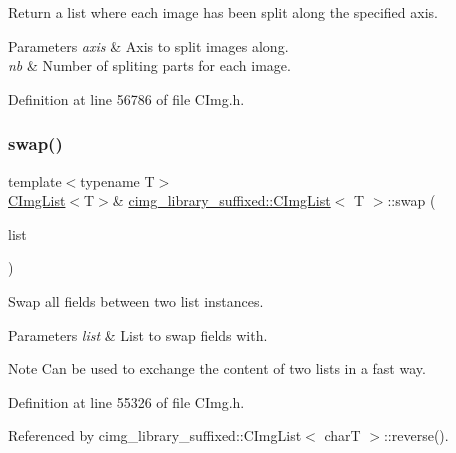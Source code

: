Return a list where each image has been split along the specified axis. 


\begin{DoxyParams}{Parameters}
{\em axis} & Axis to split images along. \\
\hline
{\em nb} & Number of spliting parts for each image. \\
\hline
\end{DoxyParams}


Definition at line 56786 of file C\+Img.\+h.

\mbox{\label{structcimg__library__suffixed_1_1CImgList_ad88b574b18ddf25e9be41d346584236b}} 
\subsubsection{\texorpdfstring{swap()}{swap()}}
{\footnotesize\ttfamily template$<$typename T$>$ \\
\hyperlink{structcimg__library__suffixed_1_1CImgList}{C\+Img\+List}$<$T$>$\& \hyperlink{structcimg__library__suffixed_1_1CImgList}{cimg\+\_\+library\+\_\+suffixed\+::\+C\+Img\+List}$<$ T $>$\+::swap (\begin{DoxyParamCaption}\item[{\hyperlink{structcimg__library__suffixed_1_1CImgList}{C\+Img\+List}$<$ T $>$ \&}]{list }\end{DoxyParamCaption})\hspace{0.3cm}{\ttfamily [inline]}}



Swap all fields between two list instances. 


\begin{DoxyParams}{Parameters}
{\em list} & List to swap fields with. \\
\hline
\end{DoxyParams}
\begin{DoxyNote}{Note}
Can be used to exchange the content of two lists in a fast way. 
\end{DoxyNote}


Definition at line 55326 of file C\+Img.\+h.



Referenced by cimg\+\_\+library\+\_\+suffixed\+::\+C\+Img\+List$<$ char\+T $>$\+::reverse().

